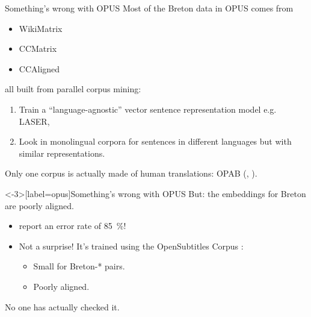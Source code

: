\documentclass[
	xcolor={svgnames},
	aspectratio=169,
	french,
]{beamer}
\begin{document}
\begin{frame}{Something's wrong with OPUS}
	\onslide<+->
	Most of the Breton data in OPUS comes from
	
	\begin{itemize}
		\item WikiMatrix \parencite{schwenk2021WikiMatrixMining135M}
		\item CCMatrix \parencite{schwenk2021CCMatrixMiningBillions}
		\item CCAligned \parencite{el-kishky2020CCAlignedMassiveCollection}
	\end{itemize}

	all built from parallel corpus mining:

	\onslide<+->

	\begin{enumerate}
		\item Train a \enquote{language-agnostic} vector sentence representation model e.g. LASER, \parencite{artetxe2019MassivelyMultilingualSentence}
		\item Look in monolingual corpora for sentences in different languages but with similar representations.
	\end{enumerate}

	\onslide<+->
	
	Only one corpus is actually made of human translations: OPAB (, \textcite{tyers2009RuleBasedAugmentationTraining}).
\end{frame}

\begin{frame}<-3>[label=opus]{Something's wrong with OPUS}
	\onslide<+->
	But: the embeddings for Breton are \alert{poorly aligned}.

	\begin{itemize}
		\item \textcite{artetxe2019MassivelyMultilingualSentence} report an \alert{error rate of \qty{85}{\percent}}!
		\item Not a surprise! It's trained using the OpenSubtitles Corpus \parencite{lison2016OpenSubtitles2016ExtractingLarge}:
			\begin{itemize}
				\item<+-> Small for Breton-* pairs.
				\item<+-> Poorly aligned.
			\end{itemize}
	\end{itemize}

	\onslide<+->
	\alert{No one has actually checked it.}
\end{frame}
\end{document}
